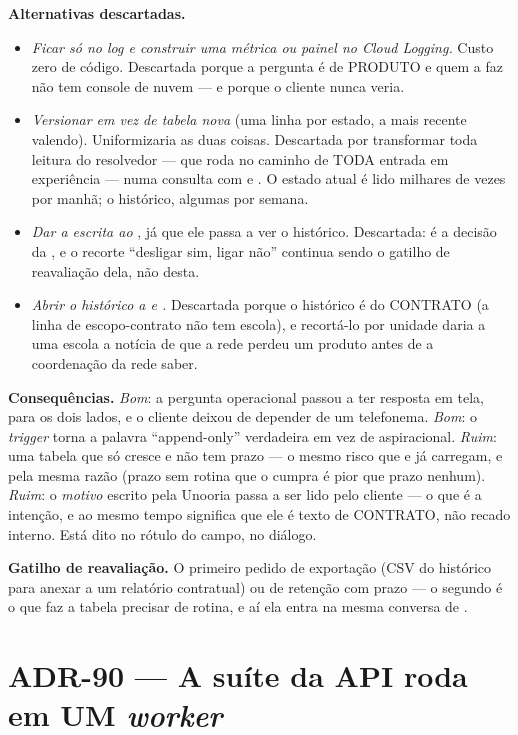 \textbf{Alternativas descartadas.}
\begin{itemize}
  \item \emph{Ficar só no log e construir uma métrica ou painel no Cloud
    Logging.} Custo zero de código. Descartada porque a pergunta é de PRODUTO e
    quem a faz não tem console de nuvem --- e porque o cliente nunca veria.
  \item \emph{Versionar  em vez de tabela nova} (uma linha
    por estado, a mais recente valendo). Uniformizaria as duas coisas.
    Descartada por transformar toda leitura do resolvedor --- que roda no caminho
    de TODA entrada em experiência --- numa consulta com  e
    . O estado atual é lido milhares de vezes por manhã; o
    histórico, algumas por semana.
  \item \emph{Dar a escrita ao }, já que ele passa a ver o
    histórico. Descartada: é a decisão da , e o recorte
    \enquote{desligar sim, ligar não} continua sendo o gatilho de reavaliação
    dela, não desta.
  \item \emph{Abrir o histórico a  e .}
    Descartada porque o histórico é do CONTRATO (a linha de escopo-contrato não
    tem escola), e recortá-lo por unidade daria a uma escola a notícia de que a
    rede perdeu um produto antes de a coordenação da rede saber.
\end{itemize}

\textbf{Consequências.} \emph{Bom}: a pergunta operacional passou a ter resposta
em tela, para os dois lados, e o cliente deixou de depender de um telefonema.
\emph{Bom}: o \emph{trigger} torna a palavra \enquote{append-only} verdadeira em
vez de aspiracional. \emph{Ruim}: uma tabela que só cresce e não tem prazo ---
o mesmo risco  que  e  já
carregam, e pela mesma razão (prazo sem rotina que o cumpra é pior que prazo
nenhum). \emph{Ruim}: o \emph{motivo} escrito pela Unooria passa a ser lido pelo
cliente --- o que é a intenção, e ao mesmo tempo significa que ele é texto de
CONTRATO, não recado interno. Está dito no rótulo do campo, no diálogo.

\textbf{Gatilho de reavaliação.} O primeiro pedido de exportação (CSV do
histórico para anexar a um relatório contratual) ou de retenção com prazo --- o
segundo é o que faz a tabela precisar de rotina, e aí ela entra na mesma
conversa de .

\section{ADR-90 --- A suíte da API roda em UM \emph{worker}}

